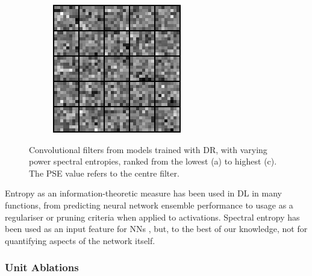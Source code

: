 \begin{figure}
\begin{subfigure}{0.3\columnwidth}
  \end{subfigure}
  \begin{subfigure}{0.3\columnwidth}
    \includegraphics[width=\linewidth]{figures/chapter6/entropy_filter/top_filts_dr}
  \end{subfigure}
  \caption{Convolutional filters from models trained with DR, with varying power spectral entropies, ranked from the lowest (a) to highest (c). The PSE value refers to the centre filter.}
  \label{fig:entropy_vis}
\end{figure}

Entropy as an information-theoretic measure has been used in DL in many
functions, from predicting neural network ensemble performance
\cite{hansen1990neural} to usage as a regulariser
\cite{khabou1999entropy} or pruning criteria \cite{luo2017entropy}
when applied to activations. Spectral entropy has been used as an input
feature for NNs
\cite{krkic1996eeg, misra2004spectral, srinivasan2005artificial, zheng1996digital},
but, to the best of our knowledge, not for quantifying aspects of the
network itself.

\hypertarget{unit-ablations}{%
\subsubsection{Unit Ablations}\label{unit-ablations}}

